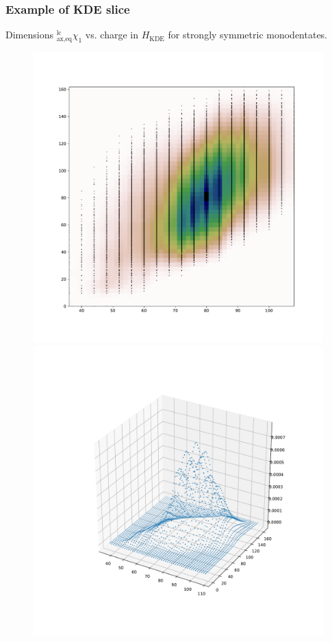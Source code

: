 \documentclass[xcolor=dvipsnames]{beamer}
\begin{document}
\begin{frame}
\frametitle{Example of KDE slice}
Dimensions $^{\textrm{lc}}_{\textrm{ax,eq}}\chi_1$ vs. charge in $H_{\textrm{KDE}}$ for strongly symmetric monodentates.
\begin{figure}[ht] 
	\begin{minipage}[b]{0.5\linewidth}
		\centering
		\includegraphics[width=1\linewidth]{img/strongsymMonodentates_heatmap.pdf} 
		\vspace{2ex}
	\end{minipage}%
	\begin{minipage}[b]{0.5\linewidth}
		\centering
		\includegraphics[width=1\linewidth]{img/strongsymMonodentates_3Dhists.pdf} 

\end{minipage}
\end{figure}
\end{frame}
\end{document}

